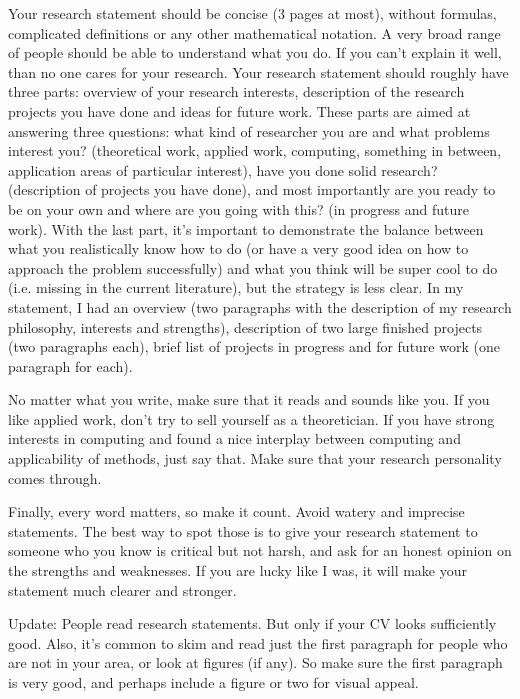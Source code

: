 \documentclass{article}
\begin{document}
Your research statement should be concise (3 pages at most), without formulas, complicated definitions or any other mathematical notation. A very broad range of people should be able to understand what you do. If you can't explain it well, than no one cares for your research. Your research statement should roughly have three parts: overview of your research interests, description of the research projects you have done and ideas for future work. These parts are aimed at answering three questions:  what kind of researcher you are and what problems interest you? (theoretical work, applied work, computing, something in between, application areas of particular interest), have you done solid research? (description of projects you have done), and most importantly are you ready to be on your own and where are you going with this? (in progress and future work). With the last part, it's important to demonstrate the balance between what you realistically know how to do (or have a very good idea on how to approach the problem successfully) and what you think will be super cool to do (i.e. missing in the current literature), but the strategy is less clear. In my statement, I had an overview (two paragraphs with the description of my research philosophy, interests and strengths), description of two large finished projects (two paragraphs each), brief list of projects in progress and for future work (one paragraph for each).

No matter what you write, make sure that it reads and sounds like you. If you like applied work, don't try to sell yourself as a theoretician. If you have strong interests in computing and found a nice interplay between computing and applicability of methods, just say that. Make sure that your research personality comes through. 

Finally, every word matters, so make it count. Avoid watery and imprecise statements. The best way to spot those is to give your research statement to someone who you know is critical but not harsh, and ask for an honest opinion on the strengths and weaknesses. If you are lucky like I was, it will make your statement much clearer and stronger.

{\color{red} Update: People read research statements. But only if your CV looks sufficiently good. Also, it's common to skim and read just the first paragraph for people who are not in your area, or look at figures (if any). So make sure the first paragraph is very good, and perhaps include a figure or two for visual appeal.}
\end{document}
